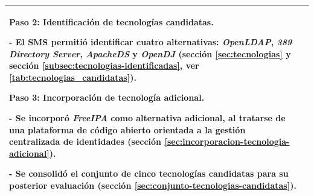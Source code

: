 \begin{table}[htbp]
\begin{tabular}{|>{\raggedright\arraybackslash}p{}|>{\raggedright\arraybackslash}p{}|}
		\textbf{Paso 2: Identificación de tecnologías candidatas.}\par\vspace{0.4em}
		- El \ac{SMS} permitió identificar cuatro alternativas: \textit{OpenLDAP}, \textit{389 Directory Server}, \textit{ApacheDS} y \textit{OpenDJ} (sección \textcolor[HTML]{1B6B93}{\ref{sec:tecnologias}} y sección \textcolor[HTML]{1B6B93}{\ref{subsec:tecnologias-identificadas}}, ver \autoref{tab:tecnologias_candidatas}).\par\vspace{0.6em}
		\textbf{Paso 3: Incorporación de tecnología adicional.}\par\vspace{0.4em}
		- Se incorporó \textit{FreeIPA} como alternativa adicional, al tratarse de una plataforma de código abierto orientada a la gestión centralizada de identidades (sección \textcolor[HTML]{1B6B93}{\ref{sec:incorporacion-tecnologia-adicional}}).\par
		- Se consolidó el conjunto de cinco tecnologías candidatas para su posterior evaluación (sección \textcolor[HTML]{1B6B93}{\ref{sec:conjunto-tecnologias-candidatas}}).                                                                                                                                                          \\
		\hline
	\end{tabular}
\end{table}
